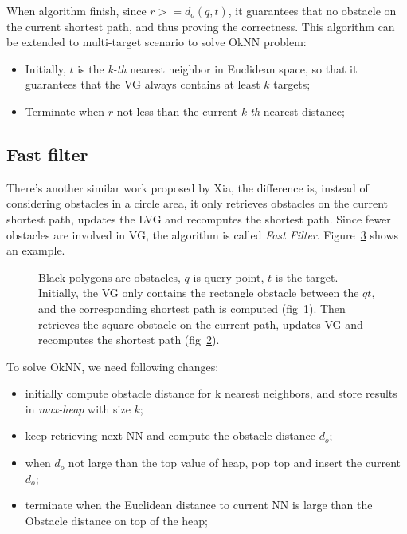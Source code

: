 When algorithm finish, since $r>=d_o(q, t)$, it guarantees that no obstacle on the current shortest
path, and thus proving the correctness. This algorithm can be extended to multi-target
scenario to solve OkNN problem:
\begin{itemize}
  \item Initially, $t$ is the \textit{k-th} nearest neighbor in Euclidean space, so that it
    guarantees that the VG always contains at least $k$ targets;
  \item Terminate when $r$  not less than the current \textit{k-th} nearest distance;
\end{itemize}

\subsection{Fast filter}

There's another similar work proposed by Xia\cite{xia2004fast},
the difference is, instead of considering obstacles in a circle area,
it only retrieves obstacles on the current shortest path,
updates the LVG and recomputes the shortest path.
Since fewer obstacles are involved in VG,
the algorithm is called \textit{Fast Filter}.
Figure~\ref{xia} shows an example.
\begin{figure}[!h]
  \centering
  \begin{subfigure}{.45\linewidth}
    \centering
    
    \caption{}
    \label{xia0}
  \end{subfigure}%
  \begin{subfigure}{.45\linewidth}
    \centering
    
    \caption{}
    \label{xia1}
  \end{subfigure}
  \caption{
    \small Black polygons are obstacles,
    $q$ is query point, $t$ is the target.
    Initially, the VG only contains
    the rectangle obstacle between the $qt$,
    and the corresponding shortest path is computed (fig~\ref{xia0}).
    Then retrieves the square
    obstacle on the current path,
    updates VG and recomputes the shortest path (fig~\ref{xia1}).
  }
  \label{xia}
\end{figure}

To solve OkNN, we need following changes:
\begin{itemize}
  \item initially compute obstacle distance for k nearest neighbors, and store results in
    \textit{max-heap} with size $k$;
  \item keep retrieving next NN and compute the obstacle distance $d_o$;
  \item when $d_o$ not large than the top value of heap, pop top and insert the current $d_o$;
  \item terminate when the Euclidean distance to current NN is large than the Obstacle distance
    on top of the heap;
\end{itemize}
